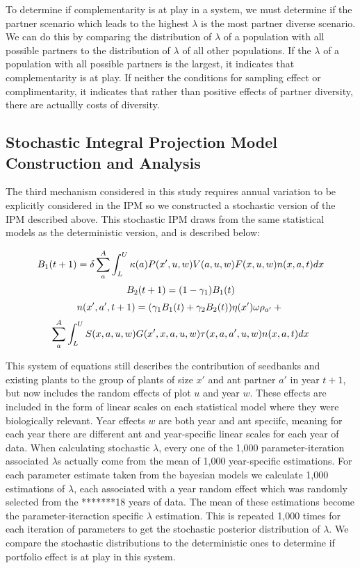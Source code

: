 \documentclass[11pt]{article}
\begin{document}
To determine if complementarity is at play in a system, we must determine if the partner scenario which leads to the highest $\lambda$ is the most partner diverse scenario.
We can do this by comparing the distribution of $\lambda$ of a population with all possible partners to the distribution of $\lambda$ of all other populations.
If the $\lambda$ of a population with all possible partners is the largest, it indicates that complementarity is at play.
If neither the conditions for sampling effect or complimentarity, it indicates that rather than positive effects of partner diversity, there are actuallly costs of diversity.


\subsection*{Stochastic Integral Projection Model Construction and Analysis}
  
The third mechanism considered in this study requires annual variation to be explicitly considered in the IPM so we constructed a stochastic version of the IPM described above. 
This stochastic IPM draws from the same statistical models as the deterministic version, and is described below:

 \begin{linenomath*}
	$$
	B_1(t+1) = \delta \sum_{a}^{A} \int_L^U  \kappa(a) P(x',u,w) V(a,u,w) F(x,u,w) n(x,a,t) dx \\
	$$
	$$
	B_2(t+1) =  (1 - \gamma_1)B_1(t)\\
	$$
	$$
	n(x',a',t+1) = (\gamma_1 B_1(t) + \gamma_2 B_2(t)) \eta(x') \omega \rho_{a'}  + \\
	$$
	$$
	\sum_{a}^{A} \int_L^U S(x,a,u,w) G(x',x,a,u,w) \tau(x,a,a',u,w) n(x,a,t) dx \\
	$$
\end{linenomath*}

This system of equations still describes the contribution of seedbanks and existing plants to the group of plants of size $x'$ and ant partner $a'$ in year $t+1$, but now includes the random effects of plot $u$ and year $w$. 
These effects are included in the form of linear scales on each statistical model where they were biologically relevant.
Year effects $w$ are both year and ant speciifc, meaning for each year there are different ant and year-specific linear scales for each year of data. 
When calculating stochastic $\lambda$, every one of the 1,000 parameter-iteration associated $\lambda$s actually come from the mean of 1,000 year-specific estimations. 
For each parameter estimate taken from the bayesian models we calculate 1,000 estimations of $\lambda$, each associated with a year random effect which was randomly selected from the *******18 years of data.
The mean of these estimations become the parameter-iteraction specific $\lambda$ estimation. 
This is repeated 1,000 times for each iteration of parameters to get the stochastic posterior distribution of $\lambda$.
We compare the stochastic distributions to the deterministic ones to determine if portfolio effect is at play in this system. 
\end{document}
